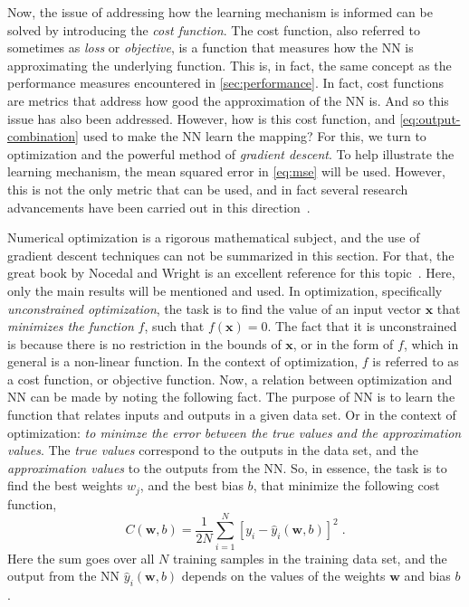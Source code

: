 Now, the issue of addressing how the learning mechanism is informed can be solved by 
introducing the \emph{cost function}. The cost function, also referred to sometimes as 
\emph{loss} or \emph{objective}, is a function that measures how the NN is approximating 
the underlying function. This is, in fact, the same concept as the performance measures 
encountered in \autoref{sec:performance}. In fact, cost functions are metrics that address 
how good the approximation of the NN is. And so this issue has also been addressed. 
However, how is this cost function, and \autoref{eq:output-combination} used to make the NN 
learn the mapping? For this, we turn to optimization and the powerful method of \emph{gradient descent}. To help illustrate the learning mechanism, the mean squared error in 
\autoref{eq:mse} will be used. However, this is not the only metric that can be used, and 
in fact several research advancements have been carried out in this direction~\cite{fontenla-romeroNewConvexObjective2010,liDiversityPromotingObjectiveFunction2016}.

Numerical optimization is a rigorous mathematical subject, and the use of gradient descent techniques can not be summarized in this section. For that, the great book by Nocedal and Wright is an excellent reference for this topic~\cite{nocedalNumericalOptimization2006}.
Here, only the main results will be mentioned and used. In optimization, specifically \emph{unconstrained optimization}, the task is to find the value of an input vector \(\bm{x}\) that \emph{minimizes the function} \(f\), such that \(f(\bm{x}) = 0\). The fact that it is unconstrained is because there is no restriction in the bounds of \(\bm{x}\), or in the form of \(f\), which in general is a non-linear function. In the context of optimization, \(f\) is referred to as a cost function, or objective function.
Now, a relation between optimization and NN can be made by noting the following fact. The 
purpose of NN is to learn the function that relates inputs and outputs in a given data set. 
Or in the context of optimization: \emph{to minimze the error between the true values and 
the approximation values}. The \emph{true values} correspond to the outputs in the data 
set, and the \emph{approximation values} to the outputs from the NN. So, in essence, the 
task is to find the best weights \(w_j\), and the best bias \(b\), that minimize the 
following cost function,
\begin{equation}
    C(\bm{w}, b) = \frac{1}{2 N} \sum_{i=1}^{N} { \left[y_i - \hat{y}_{i}(\bm{w}, b) \right] }^2
    \; .
    \label{eq:cost-nn}
\end{equation}
Here the sum goes over all $N$ training samples in the training data set, and the output 
from the NN \(\hat{y}_{i}(\bm{w}, b)\) depends on the values of the weights
\(\bm{w}\) and bias \(b\).

